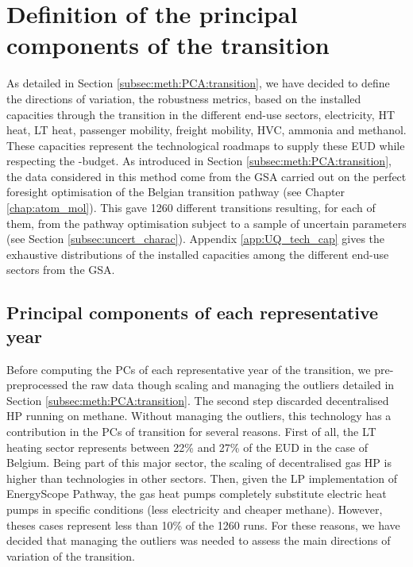 \section{Definition of the principal components of the transition}
\label{sec:RobPol:PC_transition}
As detailed in Section \ref{subsec:meth:PCA:transition}, we have decided to define the directions of variation, \ie the robustness metrics, based on the installed capacities through the transition in the different end-use sectors, \ie electricity, \gls{HT} heat, \gls{LT} heat, passenger mobility, freight mobility, \gls{HVC}, ammonia and methanol. These capacities represent the technological roadmaps to supply these \gls{EUD} while respecting the -budget.  As introduced in Section \ref{subsec:meth:PCA:transition}, the data considered in this method come from the \gls{GSA} carried out on the perfect foresight optimisation of the Belgian transition pathway (see Chapter \ref{chap:atom_mol}). This gave 1260 different transitions resulting, for each of them, from the pathway optimisation subject to a sample of uncertain parameters (see Section \ref{subsec:uncert_charac}). Appendix \ref{app:UQ_tech_cap} gives the exhaustive distributions of the installed capacities among the different end-use sectors from the \gls{GSA}.

\subsection{Principal components of each representative year}
\label{subsec:RobPol:PC_year}
Before computing the \gls{PCs} of each representative year of the transition, we pre-preprocessed the raw data though scaling and managing the outliers detailed in Section \ref{subsec:meth:PCA:transition}. The second step discarded decentralised \gls{HP} running on methane. Without managing the outliers, this technology has a contribution in the \gls{PCs} of transition for several reasons. First of all, the \gls{LT} heating sector represents between 22\% and 27\% of the \gls{EUD} in the case of Belgium. Being part of this major sector, the scaling of decentralised gas \gls{HP} is higher than technologies in other sectors. Then, given the \gls{LP} implementation of EnergyScope Pathway, the gas heat pumps completely substitute electric heat pumps in specific conditions (less electricity and cheaper methane). However, theses cases represent less than 10\% of the 1260 runs. For these reasons, we have decided that managing the outliers was needed to assess the main directions of variation of the transition.

